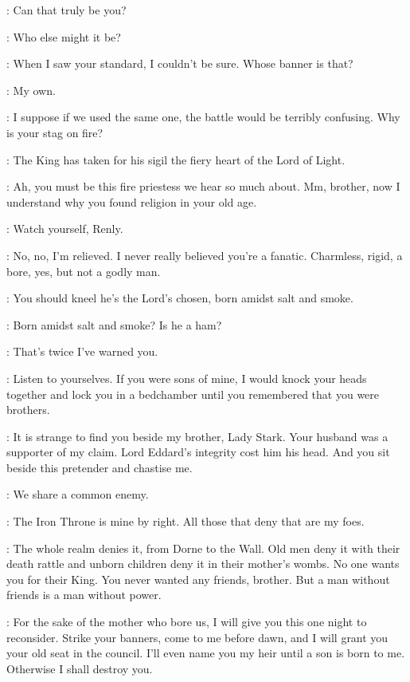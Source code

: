 \RENLY:  Can that truly be you? 

\STANNIS: Who else might it be? 

\RENLY: When I saw your standard, I couldn't be sure. Whose banner is that? 

\STANNIS: My own. 

\RENLY: I suppose if we used the same one, the battle would be terribly confusing. Why is your stag on fire? 

\MELISANDRE: The King has taken for his sigil the fiery heart of the Lord of Light. 

\RENLY: Ah, you must be this fire priestess we hear so much about. Mm, brother, now I understand why you found religion in your old age. 

\STANNIS: Watch yourself, Renly. 

\RENLY: No, no, I'm relieved. I never really believed you're a fanatic. Charmless, rigid, a bore, yes, but not a godly man. 

\MELISANDRE: You should kneel he's the Lord's chosen, born amidst salt and smoke. 

\RENLY: Born amidst salt and smoke? Is he a ham? 

\STANNIS: That's twice I've warned you. 

\CATELYN: Listen to yourselves. If you were sons of mine, I would knock your heads together and lock you in a bedchamber until you remembered that you were brothers. 

\STANNIS: It is strange to find you beside my brother, Lady Stark. Your husband was a supporter of my claim. Lord Eddard's integrity cost him his head. And you sit beside this pretender and chastise me. 

\CATELYN: We share a common enemy. 

\STANNIS: The Iron Throne is mine by right. All those that deny that are my foes. 

\RENLY: The whole realm denies it, from Dorne to the Wall. Old men deny it with their death rattle and unborn children deny it in their mother's wombs. No one wants you for their King. You never wanted any friends, brother. But a man without friends is a man without power. 

\STANNIS: For the sake of the mother who bore us, I will give you this one night to reconsider. Strike your banners, come to me before dawn, and I will grant you your old seat in the council. I'll even name you my heir until a son is born to me. Otherwise I shall destroy you. 

